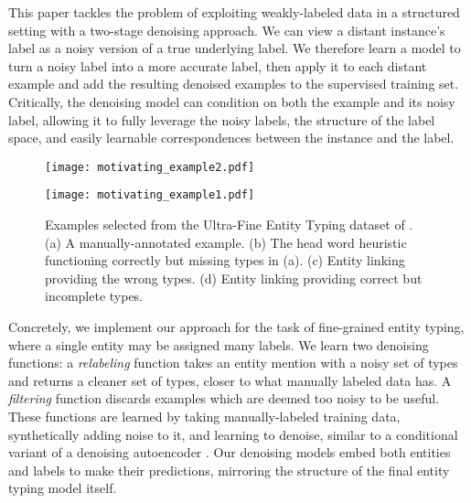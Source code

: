 \documentclass[11pt,a4paper]{article}
\begin{document}
This paper tackles the problem of exploiting weakly-labeled data in a structured setting with a two-stage denoising approach. We can view a distant instance's label as a noisy version of a true underlying label. We therefore learn a model to turn a noisy label into a more accurate label, then apply it to each distant example and add the resulting denoised examples to the supervised training set. Critically, the denoising model can condition on both the example and its noisy label, allowing it to fully leverage the noisy labels, the structure of the label space, and easily learnable correspondences between the instance and the label.







\begin{figure*}[t]
\centering
    \begin{minipage}[t]{0.45\textwidth}
    \centering
    \texttt{[image: motivating\_example2.pdf]}
    \end{minipage}
    \hspace{24pt}
    \begin{minipage}[t]{0.45\textwidth}
    \centering
    \texttt{[image: motivating\_example1.pdf]}
    \end{minipage}
    \caption{Examples selected from the Ultra-Fine Entity Typing dataset of \citet{Eunsol_Choi_18}. (a) A manually-annotated example. (b) The head word heuristic functioning correctly but missing types in (a). (c) Entity linking providing the wrong types. (d) Entity linking providing correct but incomplete types.}
    \label{fig:ds-example}
\end{figure*}



Concretely, we implement our approach for the task of fine-grained entity typing, where a single entity may be assigned many labels. We learn two denoising functions: a \emph{relabeling} function takes an entity mention with a noisy set of types and returns a cleaner set of types, closer to what manually labeled data has. A \emph{filtering} function discards examples which are deemed too noisy to be useful. These functions are learned by taking manually-labeled training data, synthetically adding noise to it, and learning to denoise, similar to a conditional variant of a denoising autoencoder \cite{Pascal_Vincent_08}. Our denoising models embed both entities and labels to make their predictions, mirroring the structure of the final entity typing model itself.
\end{document}
